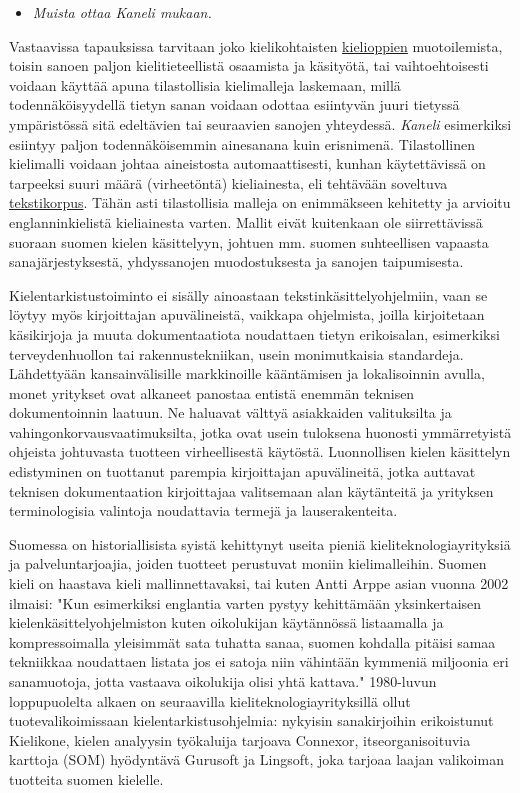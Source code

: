 \documentclass[]{../../metanetpaper}
\begin{document}
\begin{multicols}{2}
\begin{itemize}
\item[] \textit{Muista ottaa Kaneli mukaan.}
\end{itemize}
Vastaavissa tapauksissa tarvitaan joko
kielikohtaisten \underline{kielioppien} muotoilemista, toisin
sanoen paljon kielitieteellistä osaamista ja
käsityötä, tai vaihtoehtoisesti voidaan käyttää apuna tilastollisia
kielimalleja laskemaan, millä todennäköisyydellä tietyn sanan voidaan odottaa 
esiintyvän juuri tietyssä ympäristössä sitä edeltävien
tai seuraavien sanojen yhteydessä. \textit{Kaneli} esimerkiksi
esiintyy paljon todennäköisemmin ainesanana kuin
erisnimenä. Tilastollinen kielimalli voidaan johtaa aineistosta
automaattisesti, kunhan käytettävissä on tarpeeksi suuri määrä
(virheetöntä) kieliainesta, eli tehtävään soveltuva
\underline{tekstikorpus}. Tähän asti tilastollisia malleja on enimmäkseen kehitetty
ja arvioitu englanninkielistä kieliainesta varten. Mallit eivät kuitenkaan
ole siirrettävissä suoraan suomen kielen käsittelyyn, johtuen mm.
suomen suhteellisen vapaasta sanajärjestyksestä, yhdyssanojen
muodostuksesta ja sanojen taipumisesta.


Kielentarkistustoiminto ei sisälly ainoastaan
tekstinkäsittelyohjelmiin, vaan se löytyy myös kirjoittajan
apuvälineistä, vaikkapa ohjelmista, joilla kirjoitetaan käsikirjoja ja muuta
dokumentaatiota noudattaen tietyn erikoisalan, esimerkiksi
terveydenhuollon tai rakennustekniikan, usein monimutkaisia
standardeja. Lähdettyään kansainvälisille markkinoille kääntämisen ja 
lokalisoinnin avulla, monet yritykset ovat alkaneet
panostaa entistä enemmän teknisen dokumentoinnin laatuun. Ne haluavat
välttyä asiakkaiden valituksilta ja vahingonkorvausvaatimuksilta,
jotka ovat usein tuloksena huonosti ymmärretyistä ohjeista johtuvasta
tuotteen virheellisestä käytöstä. Luonnollisen kielen
käsittelyn edistyminen on tuottanut parempia kirjoittajan
apuvälineitä, jotka auttavat teknisen dokumentaation kirjoittajaa 
valitsemaan alan käytänteitä ja yrityksen terminologisia
valintoja noudattavia termejä ja lauserakenteita.

Suomessa on historiallisista syistä kehittynyt useita pieniä
kieliteknologiayrityksiä ja palveluntarjoajia, joiden tuotteet
perustuvat moniin kielimalleihin. Suomen kieli on haastava kieli
mallinnettavaksi, tai kuten Antti Arppe asian vuonna 2002 ilmaisi:
"Kun esimerkiksi englantia varten pystyy kehittämään yksinkertaisen
kielenkäsittelyohjelmiston kuten oikolukijan käytännössä listaamalla
ja kompressoimalla yleisimmät sata tuhatta sanaa, suomen kohdalla
pitäisi samaa tekniikkaa noudattaen listata jos ei satoja niin
vähintään kymmeniä miljoonia eri sanamuotoja, jotta vastaava
oikolukija olisi yhtä kattava." \cite{EiPolkua} 1980-luvun
loppupuolelta alkaen on seuraavilla kieliteknologiayrityksillä ollut
tuotevalikoimissaan kielentarkistusohjelmia: nykyisin sanakirjoihin erikoistunut
Kielikone, kielen analyysin työkaluija tarjoava Connexor, itseorganisoituvia 
karttoja (SOM) hyödyntävä Gurusoft ja Lingsoft, joka tarjoaa laajan valikoiman 
tuotteita suomen kielelle.


\end{multicols}
\end{document}
